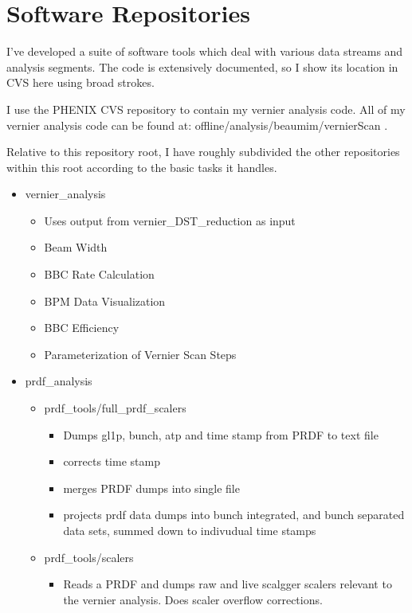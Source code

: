 \section{Software Repositories}
I've developed a suite of software tools which deal with various data streams
and analysis segments. The code is extensively documented, so I show its
location in CVS here using broad strokes.

I use the PHENIX CVS repository to contain my vernier analysis code. All of my
vernier analysis code can be found at: offline/analysis/beaumim/vernierScan .

Relative to this repository root, I have roughly subdivided the other
repositories within this root according to the basic tasks it handles.

\begin{itemize}
\item vernier\_analysis
  \begin{itemize}
    \item Uses output from vernier\_DST\_reduction as input
    \item Beam Width
    \item BBC Rate Calculation
    \item BPM Data Visualization
    \item BBC Efficiency
    \item Parameterization of Vernier Scan Steps
  \end{itemize}
\item prdf\_analysis
  \begin{itemize}
    \item prdf\_tools/full\_prdf\_scalers
      \begin{itemize}
        \item Dumps gl1p, bunch, atp and time stamp from PRDF to text file
	\item corrects time stamp
	\item merges PRDF dumps into single file
	\item projects prdf data dumps into bunch integrated, and bunch separated data
	sets, summed down to indivudual time stamps
      \end{itemize}
    \item prdf\_tools/scalers
      \begin{itemize}
        \item Reads a PRDF and dumps raw and live scalgger scalers relevant to the vernier
	analysis. Does scaler overflow corrections.
      \end{itemize}

\end{itemize}
\end{itemize}
